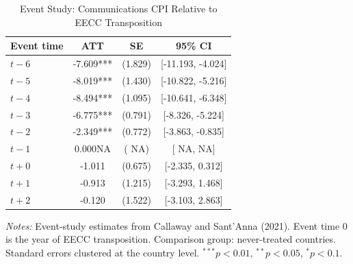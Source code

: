 \begin{table}[htbp]
\centering
\caption{Event Study: Communications CPI Relative to EECC Transposition}
\label{tab:eventstudy}
\begin{tabular}{lccc}
\hline\hline
Event time & ATT & SE & 95\% CI \\
\hline
$t - 6$ & -7.609*** & (1.829) & [-11.193, -4.024] \\
$t - 5$ & -8.019*** & (1.430) & [-10.822, -5.216] \\
$t - 4$ & -8.494*** & (1.095) & [-10.641, -6.348] \\
$t - 3$ & -6.775*** & (0.791) & [-8.326, -5.224] \\
$t - 2$ & -2.349*** & (0.772) & [-3.863, -0.835] \\
$t - 1$ & 0.000NA & (  NA) & [  NA,   NA] \\
$t + 0$ & -1.011 & (0.675) & [-2.335, 0.312] \\
$t + 1$ & -0.913 & (1.215) & [-3.293, 1.468] \\
$t + 2$ & -0.120 & (1.522) & [-3.103, 2.863] \\
\hline\hline
\end{tabular}
\begin{tablenotes}[flushleft]
\small
\item \textit{Notes:} Event-study estimates from Callaway and Sant'Anna (2021). Event time 0 is the year of EECC transposition. Comparison group: never-treated countries. Standard errors clustered at the country level. $^{***}p<0.01$, $^{**}p<0.05$, $^{*}p<0.1$.
\end{tablenotes}
\end{table}
